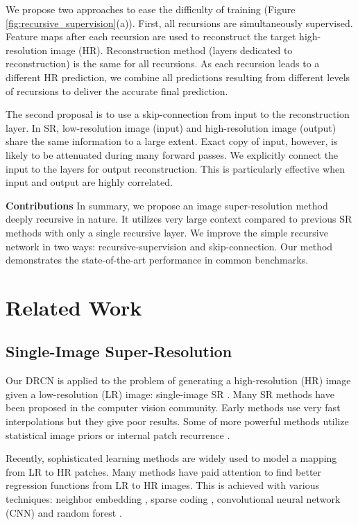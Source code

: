 \documentclass[10pt,twocolumn,letterpaper]{article}
\begin{document}
We propose two approaches to ease the difficulty of training (Figure \ref{fig:recursive_supervision}(a)). First, all recursions are simultaneously supervised. Feature maps after each recursion are used to reconstruct the target high-resolution image (HR). Reconstruction method (layers dedicated to reconstruction) is the same for all recursions. As each recursion leads to a different HR prediction, we combine all predictions resulting from different levels of recursions to deliver the accurate final prediction.  
   
The second proposal is to use a skip-connection from input to the reconstruction layer. In SR, low-resolution image (input) and high-resolution image (output) share the same information to a large extent. Exact copy of input, however, is likely to be attenuated during many forward passes. We explicitly connect the input to the layers for output reconstruction. This is particularly effective when input and output are highly correlated.

\textbf{Contributions} In summary, we propose an image super-resolution method deeply recursive in nature. It utilizes very large context compared to previous SR methods with only a single recursive layer. We improve the simple recursive network in two ways: recursive-supervision and skip-connection. Our method demonstrates the state-of-the-art performance in common benchmarks.

\section{Related Work}

\subsection{Single-Image Super-Resolution}

Our DRCN is applied to the problem of generating a high-resolution (HR) image given a low-resolution (LR) image: single-image SR \cite{Irani1991, freeman2000learning,glasner2009super}. Many SR methods have been proposed in the computer vision community. Early methods use very fast interpolations but they give poor results. Some of more powerful methods utilize statistical image priors \cite{sun2008image,Kim2010} or internal patch recurrence \cite{glasner2009super, Huang-CVPR-2015}.

Recently, sophisticated learning methods are widely used to model a mapping from LR to HR patches. Many methods have paid attention to find better regression functions from LR to HR images. This is achieved with various techniques: neighbor embedding \cite{chang2004super,bevilacqua2012}, sparse coding \cite{yang2010image,zeyde2012single,Timofte2013,Timofte}, convolutional neural network (CNN) \cite{dong2014image} and random forest \cite{schulter2015fast}.
\end{document}
